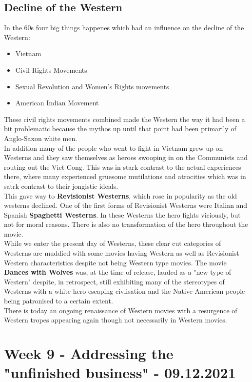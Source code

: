 \documentclass{article}
\begin{document}
	\subsection{Decline of the Western}
	In the 60s four big things happenes which had an influence on the decline of the Western:
	\begin{itemize}
		\item{Vietnam}
		\item{Civil Rights Movements}
		\item{Sexual Revolution and Women's Rights movements}
		\item{American Indian Movement}
	\end{itemize}
	These civil rights movements combined made the Western the way it had been a bit problematic because the mythos up until that point had been primarily of Anglo-Saxon white men. \\
	In addition many of the people who went to fight in Vietnam grew up on Westerns and they saw themselves as heroes swooping in on the Communists and routing out the Viet Cong. This was in stark contrast to the actual experiences there, where many experienced gruesome mutilations and atrocities which was in satrk contrast to their jongistic ideals. \\
	This gave way to \textbf{Revisionist Westerns}, which rose in popularity as the old westerns declined. One of the first forms of Revisionist Westerns were Italian and Spanish \textbf{Spaghetti Westerns}. In these Westerns the hero fights viciously, but not for moral reasons. There is also no transformation of the hero throughout the movie. \\
	While we enter the present day of Westerns, these clear cut categories of Westerns are muddied with some movies having Western as well as Revisionist Western characteristics despite not being Western type movies. The movie \textbf{Dances with Wolves} was, at the time of release, lauded as a "new type of Western" despite, in retrospect, still exhibiting many of the stereotypes of Westerns with a white hero escaping civlisation and the Native American people being patronised to a certain extent. \\
	There is today an ongoing renaissance of Western movies with a resurgence of Western tropes appearing again though not necessarily in Western movies. \\

	\section{Week 9 - Addressing the "unfinished business" - 09.12.2021}
\end{document}
